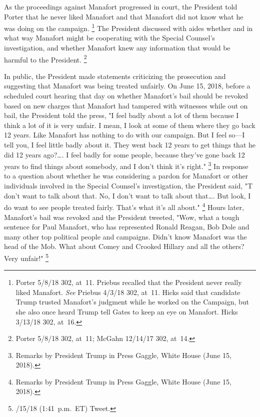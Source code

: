 {As the proceedings against Manafort progressed in court, the President told Porter that he never liked Manafort and that Manafort did not know what he was doing on the campaign.%
\footnote{Porter 5/8/18 302, at~11.
Priebus recalled that the President never really liked Manafort.
\textit{See} Priebus 4/3/18 302, at~11.
Hicks said that candidate Trump trusted Manafort's judgment while he worked on the Campaign, but she also once heard Trump tell Gates to keep an eye on Manafort.
Hicks 3/13/18 302, at~16.}
The President discussed with aides whether and in what way Manafort might be cooperating with the Special Counsel's investigation, and whether Manafort knew any information that would be harmful to the President.%
\footnote{Porter 5/8/18 302, at~11;
McGahn 12/14/17 302, at~14.}

In public, the President made statements criticizing the prosecution and suggesting that Manafort was being treated unfairly.
On June 15, 2018, before a scheduled court hearing that day on whether Manafort's bail should be revoked based on new charges that Manafort had tampered with witnesses while out on bail, the President told the press, "I feel badly about a lot of them because I think a lot of it is very unfair.
I mean, I look at some of them where they go back 12 years.
Like Manafort has nothing to do with our campaign.
But I feel so---I tell you, I feel little badly about it.
They went back 12 years to get things that he did 12 years ago?\dots.
I feel badly for some people, because they've gone back 12 years to find things about somebody, and I don't think it's right."%
\footnote{Remarks by President Trump in Press Gaggle, White House (June 15, 2018).}
In response to a question about whether he was considering a pardon for Manafort or other individuals involved in the Special Counsel's investigation, the President said, "T don't want to talk about that.
No, I don't want to talk about that\dots.
But look, I do want to see people treated fairly.
That's what it's all about."%
\footnote{Remarks by President Trump in Press Gaggle, White House (June 15, 2018).}
Hours later, Manafort's bail was revoked and the President tweeted, "Wow, what a tough sentence for Paul Manafort, who has represented Ronald Reagan, Bob Dole and many other top political people and campaigns.
Didn't know Manafort was the head of the Mob.
What about Comey and Crooked Hillary and all the others?
Very unfair!"%
\footnote{/15/18 (1:41~p.m.~ET) Tweet.}

}
